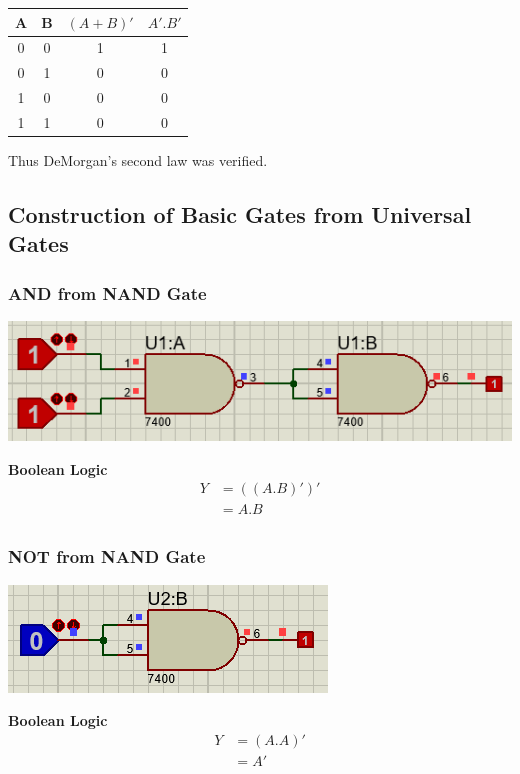 \documentclass[a4paper, 12pt]{article}
\begin{document}
\begin{center}
  \begin{tabular}{|c|c|c|c|}
    \hline
    A & B & $(A+B)'$ & $A' . B'$ \\
    \hline
    0 & 0 & 1 & 1 \\
    0 & 1 & 0 & 0 \\
    1 & 0 & 0 & 0 \\
    1 & 1 & 0 & 0 \\
    \hline
  \end{tabular}
\end{center}
Thus DeMorgan's second law was verified.
\pagebreak
  
\subsection{Construction of Basic Gates from Universal Gates}
\subsubsection{AND from NAND Gate}
\begin{center}
  \includegraphics[scale=0.75]{nand-and}
\end{center}
\textbf{Boolean Logic}
\begin{equation} 
\begin{split}
  Y & = ((A.B)')' \\
    & = A.B \\
\end{split}
\end{equation}

\subsubsection{NOT from NAND Gate}
\begin{center}
  \includegraphics[scale=0.75]{nand-not}
\end{center}
\textbf{Boolean Logic}
\begin{equation} 
\begin{split}
  Y & = (A.A)'  \\
    & = A'  \\
\end{split}
\end{equation}
\end{document}
